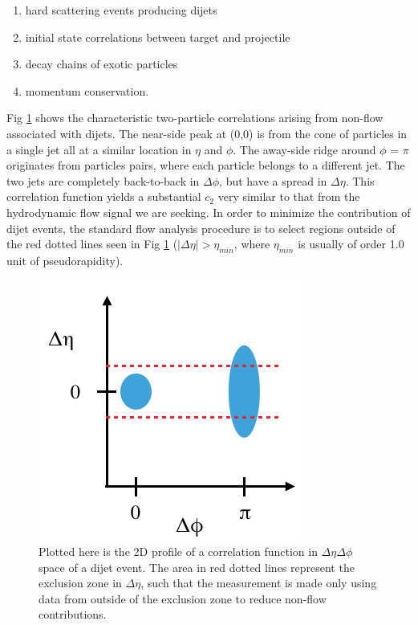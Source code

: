 \begin{enumerate}
\item hard scattering events producing dijets
\item initial state correlations between target and projectile
\item decay chains of exotic particles
\item momentum conservation.
\end{enumerate}

Fig \ref{fig:jet_corr_example} shows the characteristic two-particle correlations arising from non-flow associated with dijets. The near-side peak at (0,0) is from the cone of particles in a single jet all at a similar location in $\eta$ and $\phi$. The away-side ridge around $\phi$ = $\pi$ originates from particles pairs, where each particle belongs to a different jet. The two jets are completely back-to-back in $\Delta\phi$, but have a spread in $\Delta\eta$. This correlation function yields a substantial $c_2$ very similar to that from the hydrodynamic flow signal we are seeking. In order to minimize the contribution of dijet events, the standard flow analysis procedure is to select regions outside of the red dotted lines seen in Fig \ref{fig:jet_corr_example} ($|\Delta\eta| > \eta_{min}$, where $\eta_{min}$ is usually of order 1.0 unit of pseudorapidity).

\begin{figure}[!h]
\begin{center}
\includegraphics[width=0.5\linewidth]{figs/jet_corr_example.png}
\caption{Plotted here is the 2D profile of a correlation function in $\Delta\eta \Delta\phi$ space of a dijet event. The area in red dotted lines represent the exclusion zone in $\Delta\eta$, such that the measurement is made only using data from outside of the exclusion zone to reduce non-flow contributions.}
\label{fig:jet_corr_example}
\end{center}
\end{figure}


